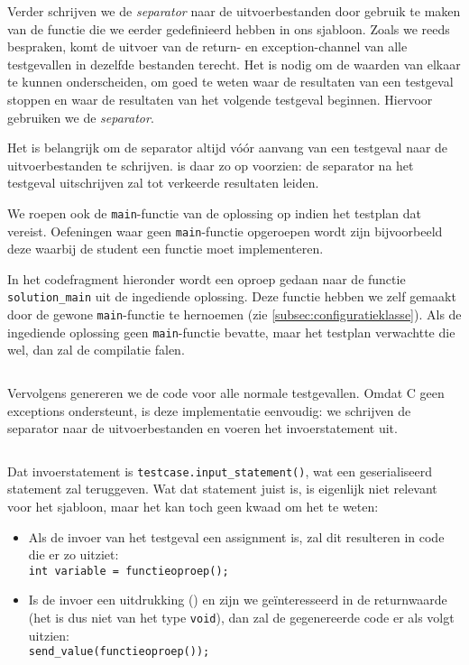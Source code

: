 Verder schrijven we de \emph{separator} naar de uitvoerbestanden door gebruik te maken van de functie die we eerder gedefinieerd hebben in ons sjabloon.
Zoals we reeds bespraken, komt de uitvoer van de return- en exception-channel van alle testgevallen in dezelfde bestanden terecht.
Het is nodig om de waarden van elkaar te kunnen onderscheiden, om goed te weten waar de resultaten van een testgeval stoppen en waar de resultaten van het volgende testgeval beginnen.
Hiervoor gebruiken we de \emph{separator}.

Het is belangrijk om de separator altijd vóór aanvang van een testgeval naar de uitvoerbestanden te schrijven.
\tested{} is daar zo op voorzien: de separator na het testgeval uitschrijven zal tot verkeerde resultaten leiden.

We roepen ook de \texttt{main}-functie van de oplossing op indien het testplan dat vereist.
Oefeningen waar geen \texttt{main}-functie opgeroepen wordt zijn bijvoorbeeld deze waarbij de student een functie moet implementeren.

In het codefragment hieronder wordt een oproep gedaan naar de functie \texttt{solution\_main} uit de ingediende oplossing.
Deze functie hebben we zelf gemaakt door de gewone \texttt{main}-functie te hernoemen (zie \cref{subsec:configuratieklasse}).
Als de ingediende oplossing geen \texttt{main}-functie bevatte, maar het testplan verwachtte die wel, dan zal de compilatie falen.

\inputminted[firstline=38,lastline=49]{mako}{sources/c-context.mako}

Vervolgens genereren we de code voor alle normale testgevallen.
Omdat C geen exceptions ondersteunt, is deze implementatie eenvoudig: we schrijven de separator naar de uitvoerbestanden en voeren het invoerstatement uit.

\inputminted[firstline=52,lastline=56]{mako}{sources/c-context.mako}

Dat invoerstatement is \texttt{testcase.input\_statement()}, wat een geserialiseerd statement zal teruggeven.
Wat dat statement juist is, is eigenlijk niet relevant voor het sjabloon, maar het kan toch geen kwaad om het te weten:

\begin{itemize}
    \item Als de invoer van het testgeval een assignment is, zal dit resulteren in code die er zo uitziet: \\
    \texttt{int variable = functieoproep();}
    
    \item Is de invoer een uitdrukking () en zijn we geïnteresseerd in de returnwaarde (het is dus niet van het type \texttt{void}), dan zal de gegenereerde code er als volgt uitzien: \\
    \texttt{send_value(functieoproep());}
\end{itemize}

